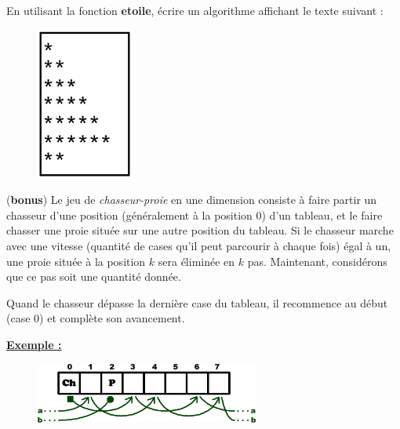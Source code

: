 \documentclass[11pt]{exam}
\begin{document}
\begin{questions}
En utilisant la fonction \textcolor{ballblue}{\bf etoile}, \'ecrire un algorithme affichant le texte suivant :

\begin{figure}[h!]
\centering
\includegraphics[height=5cm]{out1.png}
\captionsetup{labelformat=empty}
\end{figure}



\question (\textbf{bonus}) Le jeu de \textit{chasseur-proie} en une dimension consiste \`a faire partir un chasseur d'une position (g\'en\'eralement \`a la position 0) d'un tableau, et le faire chasser une proie situ\'ee sur une autre position du tableau. Si le chasseur marche avec une vitesse (quantit\'e de cases qu'il peut parcourir \`a chaque fois) \'egal \`a un, une proie situ\'ee \`a la position $k$ sera \'elimin\'ee en $k$ pas. Maintenant, consid\'erons que ce pas soit une quantit\'e donn\'ee.

Quand le chasseur d\'epasse la derni\`ere case du tableau, il recommence au d\'ebut (case 0) et compl\`ete son avancement. 

\underline{\bf Exemple : }

\begin{figure}[h!]
\centering
\includegraphics[height=2cm]{chP.png}
\captionsetup{labelformat=empty}
\end{figure}


\end{questions}
\end{document}
